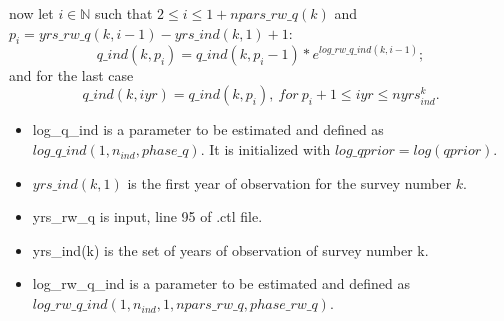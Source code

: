 \documentclass{article}
\begin{document}
now let $i\in\mathbb{N}$ such that $2\leq i \leq 1+npars\_rw\_q(k)$ and $p_i=yrs\_rw\_q(k,i-1)-yrs\_ind(k,1)+1$:
\begin{equation}
     q\_ind(k,p_i)  = q\_ind(k,p_i-1)*e^{log\_rw\_q\_ind(k,i-1)};
\end{equation}
and for the last case
\begin{equation}
    q\_ind(k,iyr)  = q\_ind(k,p_i), \ for \ p_i+1\leq iyr \leq nyrs_{ind}^k.
\end{equation}

\begin{itemize}
    \item log\_q\_ind is a parameter to be estimated and defined as $log\_q\_ind(1,n_{ind},phase\_q)$. It is initialized with $log\_qprior=log(qprior)$.
    \item $yrs\_ind(k,1)$ is the first year of observation for the survey number $k$.
    \item yrs\_rw\_q is input, line 95 of .ctl file.
    \item yrs\_ind(k) is the set of years of observation of survey number k. 
    \item log\_rw\_q\_ind is a parameter to be estimated and defined as $log\_rw\_q\_ind(1,n_{ind},1,npars\_rw\_q,phase\_rw\_q) $.
\end{itemize}
\end{document}
